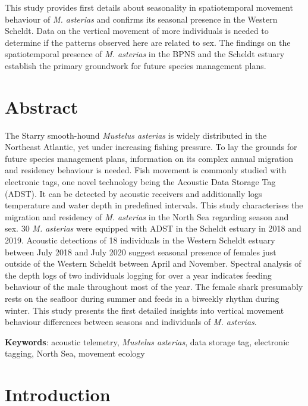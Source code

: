 \documentclass[
  authoryear,
  review,
  3p]{elsarticle}
\begin{document}
This study provides first details about seasonality in spatiotemporal
movement behaviour of \emph{M. asterias} and confirms its seasonal
presence in the Western Scheldt. Data on the vertical movement of more
individuals is needed to determine if the patterns observed here are
related to sex. The findings on the spatiotemporal presence of \emph{M.
asterias} in the BPNS and the Scheldt estuary establish the primary
groundwork for future species management plans.

\newpage{}

\hypertarget{abstract}{%
\section*{Abstract}\label{abstract}}

The Starry smooth-hound \emph{Mustelus asterias} is widely distributed
in the Northeast Atlantic, yet under increasing fishing pressure. To lay
the grounds for future species management plans, information on its
complex annual migration and residency behaviour is needed. Fish
movement is commonly studied with electronic tags, one novel technology
being the Acoustic Data Storage Tag (ADST). It can be detected by
acoustic receivers and additionally logs temperature and water depth in
predefined intervals. This study characterises the migration and
residency of \emph{M. asterias} in the North Sea regarding season and
sex. 30 \emph{M. asterias} were equipped with ADST in the Scheldt
estuary in 2018 and 2019. Acoustic detections of 18 individuals in the
Western Scheldt estuary between July 2018 and July 2020 suggest seasonal
presence of females just outside of the Western Scheldt between April
and November. Spectral analysis of the depth logs of two individuals
logging for over a year indicates feeding behaviour of the male
throughout most of the year. The female shark presumably rests on the
seafloor during summer and feeds in a biweekly rhythm during winter.
This study presents the first detailed insights into vertical movement
behaviour differences between seasons and individuals of \emph{M.
asterias}.

\textbf{Keywords}: acoustic telemetry, \emph{Mustelus asterias}, data
storage tag, electronic tagging, North Sea, movement ecology

\newpage{}

\hypertarget{sec-intro}{%
\section{Introduction}\label{sec-intro}}
\end{document}
